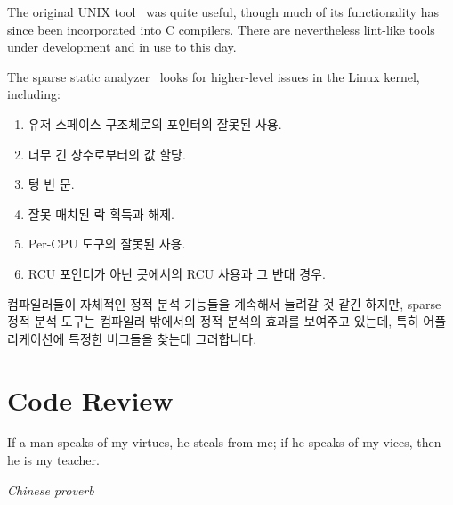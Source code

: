 The original UNIX  tool~\cite{StephenJohnson1977lint} was
quite useful, though much of its functionality has since been incorporated
into C compilers.
There are nevertheless lint-like tools under development and in use to
this day.

The sparse static analyzer~\cite{JonathanCorbet2004sparse}
looks for higher-level issues in the Linux kernel, including:
\fi

\begin{enumerate}
\item	유저 스페이스 구조체로의 포인터의 잘못된 사용.
\item	너무 긴 상수로부터의 값 할당.
\item	텅 빈  문.
\item	잘못 매치된 락 획득과 해제.
\item	Per-CPU 도구의 잘못된 사용.
\item	RCU 포인터가 아닌 곳에서의 RCU 사용과 그 반대 경우.

\end{enumerate}

컴파일러들이 자체적인 정적 분석 기능들을 계속해서 늘려갈 것 같긴 하지만, sparse
정적 분석 도구는 컴파일러 밖에서의 정적 분석의 효과를 보여주고 있는데, 특히
어플리케이션에 특정한 버그들을 찾는데 그러합니다.

\section{Code Review}
\label{sec:debugging:Code Review}
%
\epigraph{If a man speaks of my virtues, he steals from me;
	  if he speaks of my vices, then he is my teacher.}
	 {\emph{Chinese proverb}}

